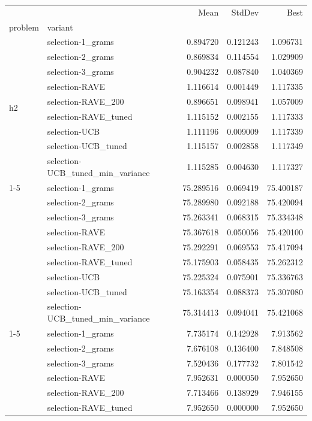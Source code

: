 \begin{tabular}{llrrr}
\toprule
 &  & Mean & StdDev & Best \\
problem & variant &  &  &  \\
\midrule
\multirow[t]{9}{*}{h2} & selection-1_grams & 0.894720 & 0.121243 & 1.096731 \\
 & selection-2_grams & 0.869834 & 0.114554 & 1.029909 \\
 & selection-3_grams & 0.904232 & 0.087840 & 1.040369 \\
 & selection-RAVE & 1.116614 & 0.001449 & 1.117335 \\
 & selection-RAVE_200 & 0.896651 & 0.098941 & 1.057009 \\
 & selection-RAVE_tuned & 1.115152 & 0.002155 & 1.117333 \\
 & selection-UCB & 1.111196 & 0.009009 & 1.117339 \\
 & selection-UCB_tuned & 1.115157 & 0.002858 & 1.117349 \\
 & selection-UCB_tuned_min_variance & 1.115285 & 0.004630 & 1.117327 \\
\cline{1-5}
\multirow[t]{9}{*}{h2o} & selection-1_grams & 75.289516 & 0.069419 & 75.400187 \\
 & selection-2_grams & 75.289980 & 0.092188 & 75.420094 \\
 & selection-3_grams & 75.263341 & 0.068315 & 75.334348 \\
 & selection-RAVE & 75.367618 & 0.050056 & 75.420100 \\
 & selection-RAVE_200 & 75.292291 & 0.069553 & 75.417094 \\
 & selection-RAVE_tuned & 75.175903 & 0.058435 & 75.262312 \\
 & selection-UCB & 75.225324 & 0.075901 & 75.336763 \\
 & selection-UCB_tuned & 75.163354 & 0.088373 & 75.307080 \\
 & selection-UCB_tuned_min_variance & 75.314413 & 0.094041 & 75.421068 \\
\cline{1-5}
\multirow[t]{9}{*}{lih} & selection-1_grams & 7.735174 & 0.142928 & 7.913562 \\
 & selection-2_grams & 7.676108 & 0.136400 & 7.848508 \\
 & selection-3_grams & 7.520436 & 0.177732 & 7.801542 \\
 & selection-RAVE & 7.952631 & 0.000050 & 7.952650 \\
 & selection-RAVE_200 & 7.713466 & 0.138929 & 7.946155 \\
 & selection-RAVE_tuned & 7.952650 & 0.000000 & 7.952650 \\

\end{tabular}
